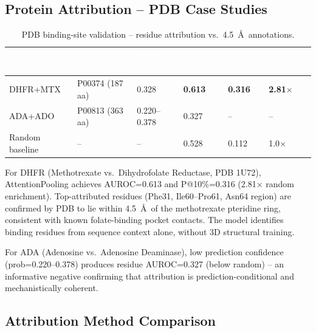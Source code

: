 \documentclass[12pt,a4paper,oneside]{report}
\newcommand{\sig}[1]{\textbf{#1}}
\begin{document}
\subsection{Protein Attribution -- PDB Case Studies}

\begin{table}[htbp]
\centering
\caption{PDB binding-site validation -- residue attribution vs.\ 4.5~\AA\ annotations.}
\label{tab:pdb}
\begin{tabular}{@{}L{2cm}L{2.2cm}C{1.5cm}C{1.5cm}C{1.5cm}C{1.5cm}@{}}
\toprule
{}
\textcolor{white}{\textbf{Case}} &
\textcolor{white}{\textbf{Protein}} &
\textcolor{white}{\textbf{DTI Prob.}} &
\textcolor{white}{\textbf{AUROC}} &
\textcolor{white}{\textbf{P@10\%}} &
\textcolor{white}{\textbf{EF@10\%}} \\
\midrule
{}
DHFR+MTX & P00374 (187 aa) & 0.328 & \sig{0.613} & \sig{0.316} & \sig{2.81$\times$} \\
ADA+ADO  & P00813 (363 aa) & 0.220--0.378 & 0.327 & -- & -- \\
Random baseline & -- & -- & 0.528 & 0.112 & 1.0$\times$ \\
\bottomrule
\end{tabular}
\end{table}

For DHFR (Methotrexate vs.\ Dihydrofolate Reductase, PDB 1U72), AttentionPooling achieves AUROC=0.613 and P@10\%=0.316 (2.81$\times$ random enrichment). Top-attributed residues (Phe31, Ile60--Pro61, Asn64 region) are confirmed by PDB to lie within 4.5~\AA\ of the methotrexate pteridine ring, consistent with known folate-binding pocket contacts. The model identifies binding residues from sequence context alone, without 3D structural training.

For ADA (Adenosine vs.\ Adenosine Deaminase), low prediction confidence (prob=0.220--0.378) produces residue AUROC=0.327 (below random) -- an informative negative confirming that attribution is prediction-conditional and mechanistically coherent.

\subsection{Attribution Method Comparison}
\end{document}
